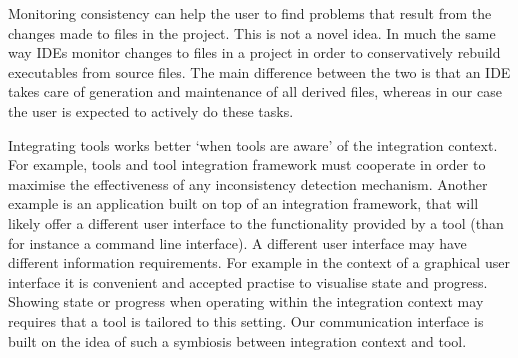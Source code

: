\documentclass{article}
\begin{document}

  Monitoring consistency can help the user to find problems that result from
  the changes made to files in the project. This is not a novel idea. In much
  the same way IDEs monitor changes to files in a project in order to
  conservatively rebuild executables from source files. The main difference
  between the two is that an IDE takes care of generation and maintenance of
  all derived files, whereas in our case the user is expected to actively do
  these tasks.


  Integrating tools works better `when tools are aware' of the integration
  context. For example, tools and tool integration framework must cooperate in
  order to maximise the effectiveness of any inconsistency detection mechanism.
  Another example is an application built on top of an integration framework,
  that will likely offer a different user interface to the functionality
  provided by a tool (than for instance a command line interface).  A different
  user interface may have different information requirements. For example in
  the context of a graphical user interface it is convenient and accepted
  practise to visualise state and progress. Showing state or progress when
  operating within the integration context may requires that a tool is tailored
  to this setting. Our communication interface is built on the idea of such a
  symbiosis between integration context and tool.
\end{document}
